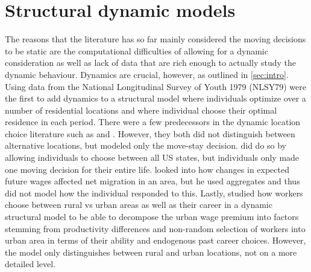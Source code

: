 \section{Structural dynamic models}
The reasons that the literature has so far mainly considered the moving decisions to be static are the computational difficulties of allowing for a dynamic consideration as well as lack of data that are rich enough to actually study the dynamic behaviour. Dynamics are crucial, however, as outlined in \autoref{sec:intro}. Using data from the National Longitudinal Survey of Youth 1979 (NLSY79) \citet{KennanWalker2011} were the first to add dynamics to a structural model where individuals optimize over a number of residential locations and where individual choose their optimal residence in each period. There were a few predecessors in the dynamic location choice literature such as \citet{Holt1997} and \citet{Tunali2000}. However, they both did not distinguish between alternative locations, but modeled only the move-stay decision. \citet{Dahl2002} did do so by allowing individuals to choose between all US states, but individuals only made one moving decision for their entire life. \citet{Gallin2004} looked into how changes in expected future wages affected net migration in an area, but he used aggregates and thus did not model how the individual responded to this. Lastly, \citet{Gould2007} studied how workers choose between rural vs urban areas as well as their career in a dynamic structural model to be able to decompose the urban wage premium into factors stemming from productivity differences and non-random selection of workers into urban area in terms of their ability and endogenous past career choices. However, the model only distinguishes between rural and urban locations, not on a more detailed level. 

